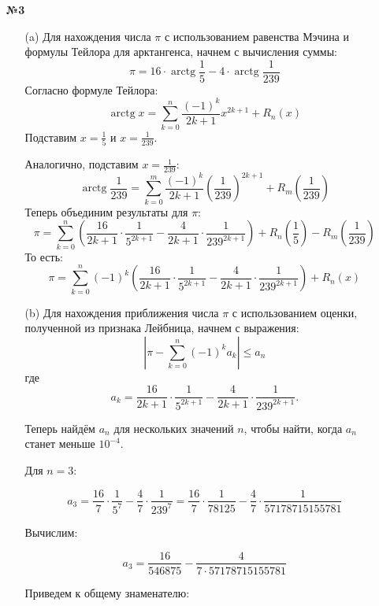 \documentclass[a4paper]{article}
\begin{document}
\begin{enumerate}
\begin{enumerate}
    \end{enumerate}

    \item[\textbf{№3}]
    \begin{enumerate}
        \item[(a)]
        Для нахождения числа $\pi$ с использованием равенства Мэчина и формулы Тейлора для арктангенса, начнем с вычисления суммы:
        $$
        \pi = 16 \cdot \operatorname{arctg} \frac{1}{5} - 4 \cdot \operatorname{arctg} \frac{1}{239}
        $$
        Согласно формуле Тейлора:
        $$
        \operatorname{arctg} x = \sum_{k=0}^{n} \frac{(-1)^{k}}{2k+1} x^{2k+1} + R_n(x)
        $$
        Подставим $x = \frac{1}{5}$ и $x = \frac{1}{239}$.
    
        Аналогично, подставим $x = \frac{1}{239}$:
        $$
        \operatorname{arctg} \frac{1}{239} = \sum_{k=0}^{m} \frac{(-1)^{k}}{2k+1} \left(\frac{1}{239}\right)^{2k+1} + R_m\left(\frac{1}{239}\right)
        $$
        Теперь объединим результаты для $\pi$:
        $$
        \pi = \sum_{k=0}^{n} \left( \frac{16}{2k+1} \cdot \frac{1}{5^{2k+1}} - \frac{4}{2k+1} \cdot \frac{1}{239^{2k+1}} \right) + R_n\left(\frac{1}{5}\right) - R_m\left(\frac{1}{239}\right)
        $$
        То есть:
        $$
        \pi = \sum_{k=0}^{n} (-1)^{k}\left( \frac{16}{2k+1} \cdot \frac{1}{5^{2k+1}} - \frac{4}{2k+1} \cdot \frac{1}{239^{2k+1}} \right) + R_n\left(x\right)
        $$

        \item[(b)]Для нахождения приближения числа $\pi$ с использованием оценки, полученной из признака Лейбница, начнем с выражения:
        $$
        \left|\pi - \sum_{k=0}^{n} (-1)^{k} a_k\right| \leqslant a_n
        $$
        где 
        $$
        a_k = \frac{16}{2k+1} \cdot \frac{1}{5^{2k+1}} - \frac{4}{2k+1} \cdot \frac{1}{239^{2k+1}}.
        $$
        
        Теперь найдём $a_n$ для нескольких значений $n$, чтобы найти, когда $a_n$ станет меньше $10^{-4}$.

        Для $n=3$:

        $$
        a_3 = \frac{16}{7} \cdot \frac{1}{5^7} - \frac{4}{7} \cdot \frac{1}{239^7} = \frac{16}{7} \cdot \frac{1}{78125} - \frac{4}{7} \cdot \frac{1}{57178715155781}
        $$

        Вычислим:

        $$
        a_3 = \frac{16}{546875} - \frac{4}{7 \cdot 57178715155781}
        $$

        Приведем к общему знаменателю:


\end{enumerate}
\end{enumerate}
\end{document}
